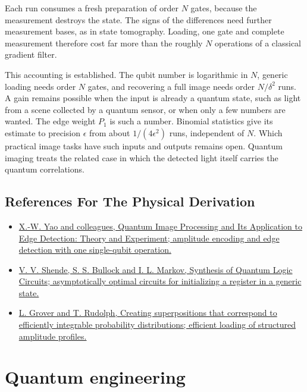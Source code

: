 \documentclass[11pt,oneside]{book}
\begin{document}
Each run consumes a fresh preparation of order \(N\) gates, because the measurement destroys the state. The signs of the differences need further measurement bases, as in state tomography. Loading, one gate and complete measurement therefore cost far more than the roughly \(N\) operations of a classical gradient filter.

This accounting is established. The qubit number is logarithmic in \(N\), generic loading needs order \(N\) gates, and recovering a full image needs order \(N/\delta^2\) runs. A gain remains possible when the input is already a quantum state, such as light from a scene collected by a quantum sensor, or when only a few numbers are wanted. The edge weight \(P_1\) is such a number. Binomial statistics give its estimate to precision \(\epsilon\) from about \(1/(4\epsilon^2)\) runs, independent of \(N\). Which practical image tasks have such inputs and outputs remains open. Quantum imaging treats the related case in which the detected light itself carries the quantum correlations.

\subsection*{References For The Physical Derivation}
\begin{itemize}
\item \href{https://arxiv.org/abs/1801.01465}{X.-W. Yao and colleagues, Quantum Image Processing and Its Application to Edge Detection: Theory and Experiment; amplitude encoding and edge detection with one single-qubit operation.}
\item \href{https://arxiv.org/abs/quant-ph/0406176}{V. V. Shende, S. S. Bullock and I. L. Markov, Synthesis of Quantum Logic Circuits; asymptotically optimal circuits for initializing a register in a generic state.}
\item \href{https://arxiv.org/abs/quant-ph/0208112}{L. Grover and T. Rudolph, Creating superpositions that correspond to efficiently integrable probability distributions; efficient loading of structured amplitude profiles.}
\end{itemize}





\clearpage

\section{Quantum engineering}
\end{document}
